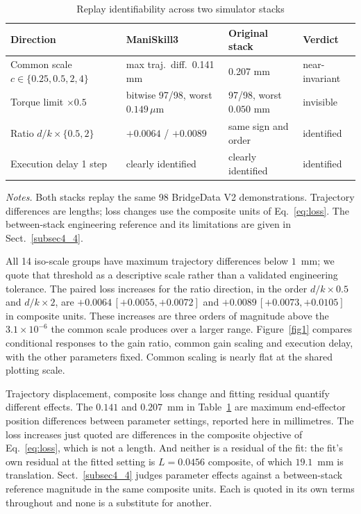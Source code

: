 \documentclass[pdflatex,iicol,sn-apa]{sn-jnl}
\theoremstyle{remark}
\newcommand{\tablenote}[1]{\par\vspace{4pt}\noindent
\begin{minipage}{\linewidth}\tablefootnotefont\raggedright #1\par\end{minipage}}
\begin{document}
\begin{table}[t]
\caption{Replay identifiability across two simulator stacks}\label{tab1}
\setlength{\tabcolsep}{2pt}
\begin{tabular}{@{}llll@{}}
\toprule
Direction & ManiSkill3 & Original stack & Verdict \\
\midrule
Common scale $c \in \{0.25, 0.5, 2, 4\}$ & max traj.\ diff.\ 0.141 mm & 0.207 mm & near-invariant \\
Torque limit $\times 0.5$ & bitwise 97/98, worst $0.149\,\mu$m & 97/98, worst $0.050$ mm & invisible \\
Ratio $d/k \times \{0.5, 2\}$ & $+0.0064$ / $+0.0089$ & same sign and order & identified \\
Execution delay 1 step & clearly identified & clearly identified & identified \\
\bottomrule
\end{tabular}
\tablenote{\textit{Notes.} Both stacks replay the same 98 BridgeData V2 demonstrations. Trajectory differences are lengths; loss changes use the composite units of Eq.~\eqref{eq:loss}. The between-stack engineering reference and its limitations are given in Sect.~\ref{subsec4_4}.}
\end{table}

All 14 iso-scale groups have maximum trajectory differences below $1$~mm; we quote that threshold
as a descriptive scale rather than a validated engineering tolerance. The paired loss increases for
the ratio direction, in the order $d/k \times 0.5$ and $d/k \times 2$, are
$+0.0064\,[+0.0055, +0.0072]$ and $+0.0089\,[+0.0073, +0.0105]$ in composite units. These increases are three orders of magnitude above the $3.1\times10^{-6}$ the common scale produces over a
larger range. Figure~\ref{fig1} compares
conditional responses to the gain ratio, common gain scaling and execution delay, with the other
parameters fixed. Common scaling is nearly flat at the shared plotting scale.

Trajectory displacement, composite loss change and fitting residual quantify different effects. The
$0.141$ and $0.207$~mm in Table~\ref{tab1} are maximum end-effector position differences
between parameter settings, reported here in millimetres. The loss increases just quoted are differences in the
composite objective of Eq.~\eqref{eq:loss}, which is not a length. And neither is a residual
of the fit: the fit's own residual at the fitted setting is $L = 0.0456$ composite, of which
$19.1$~mm is translation. Sect.~\ref{subsec4_4} judges parameter effects against a between-stack
reference magnitude in the same composite units. Each is quoted in its own terms throughout and none
is a substitute for another.
\end{document}
